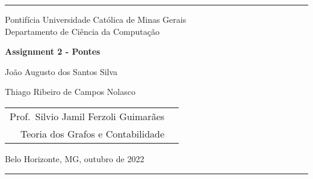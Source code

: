 \documentclass[12pt]{article}
\newcommand{\hlw}[1]{\rule{\textwidth}{#1}}
\begin{document}
\begin{titlepage}
\begin{large}
\noindent\hlw{.5mm} %

\vspace*{5mm}
\begin{center}
Pontifícia Universidade Católica de Minas Gerais\\
Departamento de Ciência da Computação

\vspace*{\fill}

{\Large\textbf{Assignment 2 - Pontes}}

\vspace*{2cm}

\begin{center}
João Augusto dos Santos Silva

Thiago Ribeiro de Campos Nolasco
\end{center}

\vspace*{4cm}

\begin{tabular}{rp{9cm}}
Prof.\ Silvio Jamil Ferzoli Guimarães\\
Teoria dos Grafos e Contabilidade
\end{tabular}

\vspace*{\fill}

Belo Horizonte, MG, outubro de 2022

\noindent\hlw{.5mm}
\end{center}
\end{large}
\end{titlepage}

\begin{spacing}{1.25}
\newpage 
\tableofcontents

\newpage


\end{spacing}

 
 
\end{document}
